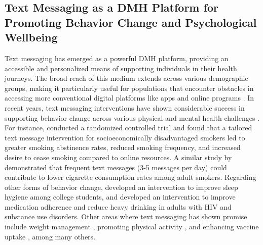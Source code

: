 \subsection{Text Messaging as a DMH Platform for Promoting
Behavior Change and Psychological Wellbeing}
Text messaging has emerged as a powerful DMH platform, providing an accessible and personalized means of supporting individuals in their health journeys. The broad reach of this medium extends across various demographic groups, making it particularly useful for populations that encounter obstacles in accessing more conventional digital platforms like apps and online programs \cite{muench2017more, bhattacharjee2022kind}.
In recent years, text messaging interventions have shown considerable success in supporting behavior change across various physical and mental health challenges \cite{haug2013efficacy, haug2013pre, yun2013text, suffoletto2023effectiveness, shalaby2022text, figueroa2022daily, bhandari2022effectiveness, villanti2022tailored, gipson2019effects}. For instance, \citet{villanti2022tailored} conducted a randomized controlled trial and found that a tailored text message intervention for socioeconomically disadvantaged smokers led to greater smoking abstinence rates, reduced smoking frequency, and increased desire to cease smoking compared to online resources. A similar study by \citet{liao2018effectiveness} demonstrated that frequent text messages (3-5 messages per day) could contribute to lower cigarette consumption rates among adult smokers. 
Regarding other forms of behavior change, \citet{gipson2019effects} developed an intervention to improve sleep hygiene among college students, and \citet{glasner2022promising} developed an intervention to improve medication adherence and reduce heavy drinking in adults with HIV and substance use disorders. 
Other areas where text messaging has shown promise include weight management \cite{siopis2015systematic, donaldson2014text}, promoting physical activity \cite{kim2013text, smith2020text, murnane2020designing}, and enhancing vaccine uptake \cite{buttenheim2022effects, mehta2022effect}, among many others.

